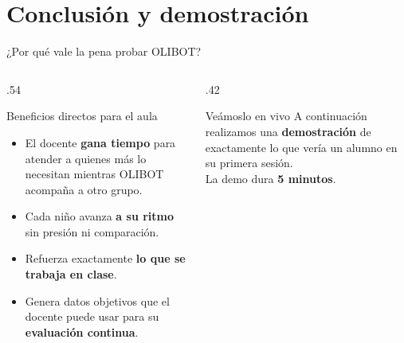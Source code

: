 \documentclass[aspectratio=169, 11pt]{beamer}
\newcommand{\icono}[1]{\textcolor{verde}{\faIcon{#1}}}
\begin{document}
\section{Conclusión y demostración}

\begin{frame}{¿Por qué vale la pena probar OLIBOT?}

  \begin{columns}[T]
    \begin{column}{.54\textwidth}
      \begin{exampleblock}{\icono{check-double}\; Beneficios directos para el aula}
        \normalsize
        \begin{itemize}
          \item El docente \textbf{gana tiempo} para atender a quienes más lo necesitan mientras OLIBOT acompaña a otro grupo.
          \item Cada niño avanza \textbf{a su ritmo} sin presión ni comparación.
          \item Refuerza exactamente \textbf{lo que se trabaja en clase}.
          \item Genera datos objetivos que el docente puede usar para su \textbf{evaluación continua}.
        \end{itemize}
      \end{exampleblock}
    \end{column}
    \begin{column}{.42\textwidth}
      \vspace{8pt}
      \begin{block}{\icono{eye}\; Veámoslo en vivo}
        \small
        A continuación realizamos una \textbf{demostración} de exactamente lo que vería un alumno en su primera sesión.\\[4pt]
        La demo dura \textbf{5 minutos}.
      \end{block}
    \end{column}
  \end{columns}
\end{frame}
\end{document}
